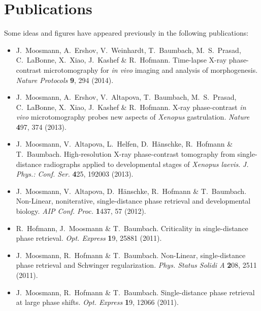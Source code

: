 \documentclass[
twoside,
openright,
titlepage,
numbers=noenddot,
headinclude,
fleqn,
a4paper,
footinclude=true,
cleardoublepage=empty,
abstractoff,
BCOR=5mm,
paper=a4,
fontsize=11pt,
british,ngerman,american,
]{scrreprt}
\begin{document}
\endgroup			
\vfill
\cleardoublepage
{}
\chapter*{Publications}

Some ideas and figures have appeared previously in the following
publications:
\begin{itemize}[leftmargin=*]

\item[] J.~Moosmann, A.~Ershov, V.~Weinhardt, T.~Baumbach,
  M.~S.~Prasad, C.~LaBonne, X.~Xiao, J.~Kashef \&
  R.~Hofmann. Time-lapse X-ray phase-contrast microtomography for
  \emph{in vivo} imaging and analysis of morphogenesis. \emph{Nature
    Protocols} {\textbf 9}, 294 (2014).

\item[] J.~Moosmann, A.~Ershov, V.~Altapova, T.~Baumbach,
  M.~S.~Prasad, C.~LaBonne, X.~Xiao, J.~Kashef \& R.~Hofmann. X-ray
  phase-contrast \emph{in vivo} microtomography probes new aspects of
  \emph{Xenopus} gastrulation. \emph{Nature} {\textbf 497}, 374 (2013).

\item[] J.~Moosmann, V.~Altapova, L.~Helfen, D.~Hänschke,
  R.~Hofmann \& T.~Baumbach. High-resolution X-ray phase-contrast
  tomography from single-distance radiographs applied to developmental
  stages of \emph{Xenopus laevis}. \emph{J. Phys.: Conf. Ser.} {\textbf
    425}, 192003 (2013).

\item[] J.~Moosmann, V.~Altapova, D.~Hänschke, R.~Hofmann \&
  T.~Baumbach.  Non-Linear, noniterative, single-distance phase
  retrieval and developmental biology. \emph{AIP Conf. Proc.} {\textbf
    1437}, 57 (2012).

\item[] R.~Hofmann, J.~Moosmann \& T.~Baumbach. Criticality in
  single-distance phase retrieval. \emph{Opt. Express} {\textbf 19}, 25881
  (2011).

\item[] J.~Moosmann, R.~Hofmann \& T.~Baumbach. Non-Linear,
  single-distance phase retrieval and Schwinger regularization.
  \emph{Phys. Status Solidi A} {\textbf 208}, 2511 (2011).

\item[] J.~Moosmann, R.~Hofmann \& T.~Baumbach. Single-distance phase
  retrieval at large phase shifts. \emph{Opt. Express} {\textbf 19}, 12066
  (2011).


\end{itemize}
\end{document}
